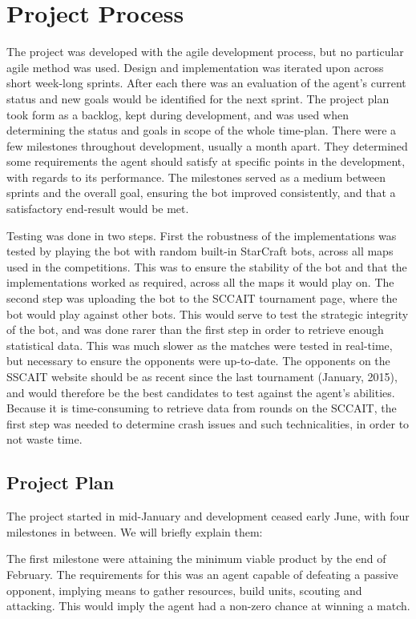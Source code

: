\chapter{Project Process}
The project was developed with the agile development process, but no particular agile method was used. Design and implementation was iterated upon across short week-long sprints. After each there was an evaluation of the agent's current status and new goals would be identified for the next sprint. The project plan took form as a backlog, kept during development, and was used when determining the status and goals in scope of the whole time-plan. There were a few milestones throughout development, usually a month apart. They determined some requirements the agent should satisfy at specific points in the development, with regards to its performance. The milestones served as a medium between sprints and the overall goal, ensuring the bot improved consistently, and that a satisfactory end-result would be met.

Testing was done in two steps. First the robustness of the implementations was tested by playing the bot with random built-in StarCraft bots, across all maps used in the competitions. This was to ensure the stability of the bot and that the implementations worked as required, across all the maps it would play on. The second step was uploading the bot to the SCCAIT tournament page, where the bot would play against other bots. This would serve to test the strategic integrity of the bot, and was done rarer than the first step in order to retrieve enough statistical data. This was much slower as the matches were tested in real-time, but necessary to ensure the opponents were up-to-date. The opponents on the SSCAIT website should be as recent since the last tournament (January, 2015), and would therefore be the best candidates to test against the agent's abilities. Because it is time-consuming to retrieve data from rounds on the SCCAIT, the first step was needed to determine crash issues and such technicalities, in order to not waste time.

\section{Project Plan}
The project started in mid-January and development ceased early June, with four milestones in between. We will briefly explain them:


The first milestone were attaining the minimum viable product by the end of February. The requirements for this was an agent capable of defeating a passive opponent, implying means to gather resources, build units, scouting and attacking. This would imply the agent had a non-zero chance at winning a match.

